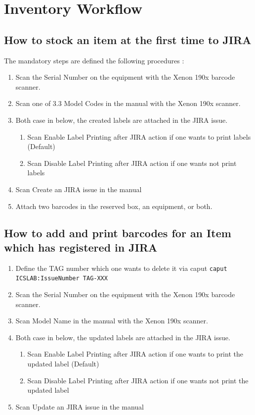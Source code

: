 \documentclass[11pt
  , a4paper
  , article
  , oneside
  , showtrims
]{memoir}
\begin{document}
\section{Inventory Workflow}

\subsection{How to stock an item at the first time to JIRA}

The mandatory steps are defined the following procedures :
\begin{enumerate}
\item Scan the Serial Number on the equipment  with the Xenon 190x barcode scanner.
\item Scan  one of 3.3 Model Codes in the manual with the Xenon 190x scanner.
\item Both case in below, the created labels are attached in the JIRA issue.
  \begin{enumerate}
  \item Scan Enable Label Printing after JIRA action if one wants to print labels (Default)
  \item Scan Disable Label Printing after JIRA action if one wants not print labels
  \end{enumerate}
\item Scan Create an JIRA issue in the manual
\item Attach two barcodes in the reserved box, an equipment, or both.
\end{enumerate}


\subsection{How to add and print barcodes for an Item which has registered in JIRA}

\begin{enumerate}
\item Define the TAG number which one wants to delete it via caput \newline
  \texttt{caput ICSLAB:IssueNumber TAG-XXX}
\item Scan the Serial Number on the equipment  with the Xenon 190x barcode scanner.
\item Scan  Model Name in the manual with the Xenon 190x scanner.
\item Both case in below, the updated labels are attached in the JIRA issue.
  \begin{enumerate}
  \item Scan Enable Label Printing after JIRA action if one wants to print the updated label (Default)
  \item Scan Disable Label Printing after JIRA action if one wants not print the updated label
  \end{enumerate}
\item Scan Update an JIRA issue in the manual
\end{enumerate}
\end{document}
